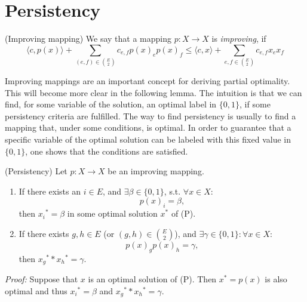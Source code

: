 \section{Persistency}
\begin{definition}{(Improving mapping)}
We say that a mapping $p: X \rightarrow X$ is \textit{improving}, if
\begin{equation}
    \langle c,p(x) \rangle + \sum_{(e,f) \in {E \choose 2}} c_{e,f} p(x)_e p(x)_f \leq \langle c,x \rangle + \sum_{e,f \in {E \choose 2}} c_{e,f} x_e x_f 
\end{equation}
\end{definition}
Improving mappings are an important concept for deriving partial optimality. This will become more clear in the following lemma. The intuition is that we can find, for some variable of the solution, an optimal label in $\{0,1\}$, if some persistency criteria are fulfilled. The way to find persistency is usually to find a mapping that, under some conditions, is optimal. In order to guarantee that a specific variable of the optimal solution can be labeled with this fixed value in $\{0,1\}$, one shows that the conditions are satisfied.
\begin{lemma}{(Persistency)}
Let $p:X \to X$ be an improving mapping. 
\begin{enumerate} 
\item If there exists an $i \in E$, and $\exists \beta \in \{0,1 \}$, s.t. $\forall x \in X$:
\[ p(x)_i = \beta, \] then ${x_i}^* = \beta$ in some optimal solution $x^*$ of (P).
\item If there exists $g, h \in E$ (or $(g,h) \in { E \choose 2 }$), and $\exists \gamma \in \{0,1\}: \forall x \in X:$
\[ p(x)_g p(x)_h = \gamma, \] then ${x_g}^* * {x_h}^* = \gamma$. 
\end{enumerate}
\end{lemma}
\textit{Proof:} Suppose that $x$ is an optimal solution of (P). Then $x^*=p(x)$ is also optimal and thus ${x_i}^*=\beta$ and ${x_g}^* * {x_h}^*=\gamma$. 
